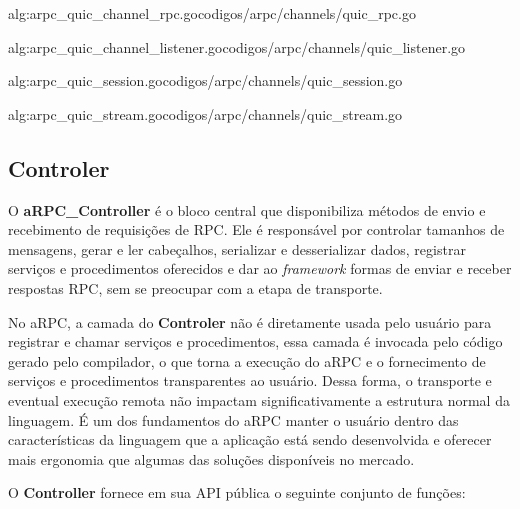  {alg:arpc_quic_channel_rpc.go}{codigos/arpc/channels/quic_rpc.go}{}

 {alg:arpc_quic_channel_listener.go}{codigos/arpc/channels/quic_listener.go}{}

 {alg:arpc_quic_session.go}{codigos/arpc/channels/quic_session.go}{}

 {alg:arpc_quic_stream.go}{codigos/arpc/channels/quic_stream.go}{}


\subsection{Controler}

O \textbf{aRPC\_Controller} é o bloco central que disponibiliza métodos de envio e recebimento de requisições de RPC. Ele é responsável por controlar tamanhos de mensagens, gerar e ler cabeçalhos, serializar e desserializar dados, registrar serviços e procedimentos oferecidos e dar ao \textit{framework} formas de enviar e receber respostas RPC, sem se preocupar com a etapa de transporte. 

No aRPC, a camada do \textbf{Controler} não é diretamente usada pelo usuário para registrar e chamar serviços e procedimentos, essa camada é invocada pelo código gerado pelo compilador, o que torna a execução do aRPC e o fornecimento de serviços e procedimentos transparentes ao usuário. Dessa forma, o transporte e eventual execução remota não impactam significativamente a estrutura normal da linguagem. É um dos fundamentos do aRPC manter o usuário dentro das características da linguagem que a aplicação está sendo desenvolvida e oferecer mais ergonomia que algumas das soluções disponíveis no mercado.

O \textbf{Controller} fornece em sua API pública o seguinte conjunto de funções:


